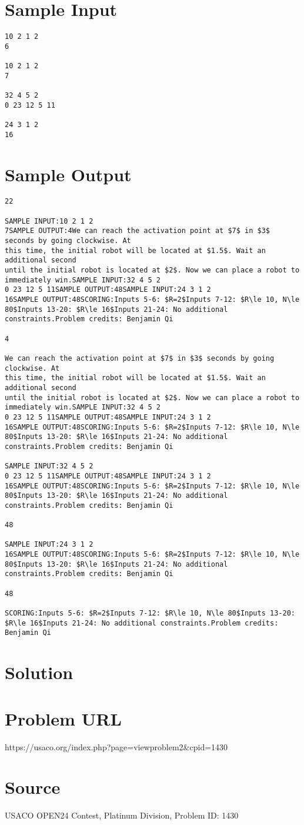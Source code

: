 \documentclass[12pt]{article}
\begin{document}
\section*{Sample Input}
\begin{verbatim}
10 2 1 2
6

10 2 1 2
7

32 4 5 2
0 23 12 5 11

24 3 1 2
16
\end{verbatim}

\section*{Sample Output}
\begin{verbatim}
22

SAMPLE INPUT:10 2 1 2
7SAMPLE OUTPUT:4We can reach the activation point at $7$ in $3$ seconds by going clockwise. At
this time, the initial robot will be located at $1.5$. Wait an additional second
until the initial robot is located at $2$. Now we can place a robot to
immediately win.SAMPLE INPUT:32 4 5 2
0 23 12 5 11SAMPLE OUTPUT:48SAMPLE INPUT:24 3 1 2
16SAMPLE OUTPUT:48SCORING:Inputs 5-6: $R=2$Inputs 7-12: $R\le 10, N\le 80$Inputs 13-20: $R\le 16$Inputs 21-24: No additional constraints.Problem credits: Benjamin Qi

4

We can reach the activation point at $7$ in $3$ seconds by going clockwise. At
this time, the initial robot will be located at $1.5$. Wait an additional second
until the initial robot is located at $2$. Now we can place a robot to
immediately win.SAMPLE INPUT:32 4 5 2
0 23 12 5 11SAMPLE OUTPUT:48SAMPLE INPUT:24 3 1 2
16SAMPLE OUTPUT:48SCORING:Inputs 5-6: $R=2$Inputs 7-12: $R\le 10, N\le 80$Inputs 13-20: $R\le 16$Inputs 21-24: No additional constraints.Problem credits: Benjamin Qi

SAMPLE INPUT:32 4 5 2
0 23 12 5 11SAMPLE OUTPUT:48SAMPLE INPUT:24 3 1 2
16SAMPLE OUTPUT:48SCORING:Inputs 5-6: $R=2$Inputs 7-12: $R\le 10, N\le 80$Inputs 13-20: $R\le 16$Inputs 21-24: No additional constraints.Problem credits: Benjamin Qi

48

SAMPLE INPUT:24 3 1 2
16SAMPLE OUTPUT:48SCORING:Inputs 5-6: $R=2$Inputs 7-12: $R\le 10, N\le 80$Inputs 13-20: $R\le 16$Inputs 21-24: No additional constraints.Problem credits: Benjamin Qi

48

SCORING:Inputs 5-6: $R=2$Inputs 7-12: $R\le 10, N\le 80$Inputs 13-20: $R\le 16$Inputs 21-24: No additional constraints.Problem credits: Benjamin Qi
\end{verbatim}

\section*{Solution}


\section*{Problem URL}
https://usaco.org/index.php?page=viewproblem2&cpid=1430

\section*{Source}
USACO OPEN24 Contest, Platinum Division, Problem ID: 1430
\end{document}
